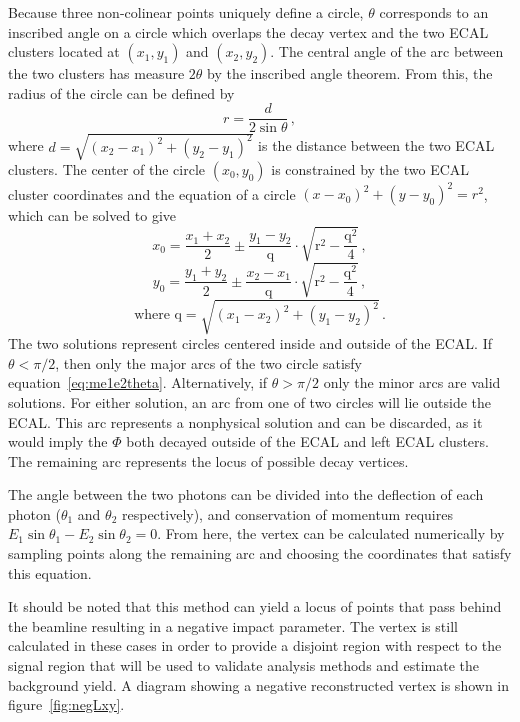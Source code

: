 Because three non-colinear points uniquely define a circle, $\theta$ corresponds to an inscribed angle on a circle which overlaps the decay vertex and the two ECAL clusters located at $(x_1, y_1)$ and $(x_2, y_2)$. The central angle of the arc between the two clusters has measure $2\theta$ by the inscribed angle theorem. From this, the radius of the circle can be defined by
\begin{equation} \label{eq:vertex_r}
	r=\frac{d}{2\sin{\theta}}\,,
\end{equation}
where $d=\sqrt{(x_2-x_1)^2+(y_2-y_1)^2}$ is the distance between the two ECAL clusters. The center of the circle $(x_0, y_0)$ is constrained by the two ECAL cluster coordinates and the equation of a circle $(x-x_0)^2+(y-y_0)^2=r^2$, which can be solved to give
\begin{equation} \label{eq:vertex_x0}
	x_0=\frac{x_1+x_2}{2}\pm\frac{y_1-y_2}{\text{q}}\cdot\sqrt{\text{r}^2-\frac{\text{q}^2}{4}}\,,
\end{equation}
\begin{equation} \label{eq:vertex_y0}
	y_0=\frac{y_1+y_2}{2}\pm\frac{x_2-x_1}{\text{q}}\cdot\sqrt{\text{r}^2-\frac{\text{q}^2}{4}}\,,
\end{equation}
\begin{equation} \label{eq:vertex_q}
	\text{where q}=\sqrt{(x_1-x_2)^2+(y_1-y_2)^2}\,.
\end{equation}
The two solutions represent circles centered inside and outside of the ECAL. If $\theta<\pi/2$, then only the major arcs of the two circle satisfy equation~\ref{eq:me1e2theta}. Alternatively, if $\theta>\pi/2$ only the minor arcs are valid solutions. For either solution, an arc from one of two  circles will lie outside the ECAL. This arc represents a nonphysical solution and can be discarded, as it would imply the $\Phi$ both decayed outside of the ECAL and left ECAL clusters. The remaining arc represents the locus of possible decay vertices.

The angle between the two photons can be divided into the deflection of each photon ($\theta_1$ and $\theta_2$ respectively), and conservation of momentum requires $E_1\sin{\theta_1}-E_2\sin{\theta_2}=0$. From here, the vertex can be calculated numerically by sampling points along the remaining arc and choosing the coordinates that satisfy this equation.

It should be noted that this method can yield a locus of points that pass behind the beamline resulting in a negative impact parameter. The vertex is still calculated in these cases in order to provide a disjoint region with respect to the signal region that will be used to validate analysis methods and estimate the background yield. A diagram showing a negative reconstructed vertex is shown in figure~\ref{fig:negLxy}.

